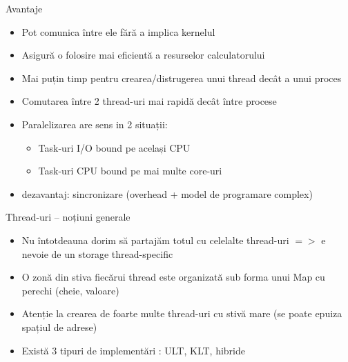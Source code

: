 \documentclass{so.cs.pub.ro}
\begin{document}
\begin{frame}{Avantaje}
\begin{itemize}
	\item Pot comunica între ele fără a implica kernelul
	\item Asigură o folosire mai eficientă a resurselor calculatorului
	\item Mai puțin timp pentru crearea/distrugerea unui thread decât a unui proces
	\item Comutarea între 2 thread-uri mai rapidă decât între procese
	\vspace{0.3cm}
	\item Paralelizarea are sens in 2 situații:
	\begin{itemize}
		\item Task-uri I/O bound pe același CPU
		\item Task-uri CPU bound pe mai multe core-uri
	\end{itemize}
	\vspace{0.3cm}
	\item dezavantaj: sincronizare (overhead + model de programare complex)
\end{itemize}
\end{frame}

\begin{frame}{Thread-uri – noțiuni generale}
\begin{itemize}
	\item Nu întotdeauna dorim să partajăm totul cu celelalte thread-uri $=>$ e nevoie de un storage thread-specific
	\vspace{0.1cm}
	\item O zonă din stiva fiecărui thread este organizată sub forma unui Map cu perechi (cheie, valoare)
	\vspace{0.1cm}
	\item Atenție la crearea de foarte multe thread-uri cu stivă mare (se poate epuiza spațiul de adrese)
	\vspace{0.5cm}
	\item Există 3 tipuri de implementări : ULT, KLT, hibride
\end{itemize}
\end{frame}
\end{document}
